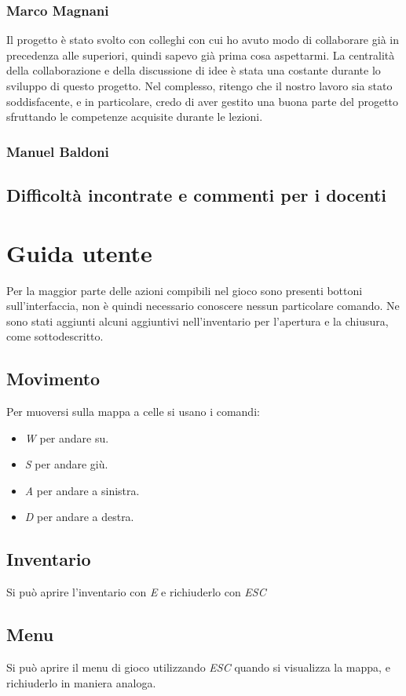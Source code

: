 \documentclass[a4paper,12pt]{report}
\begin{document}
\subsection{Marco Magnani}
Il progetto è stato svolto con colleghi con cui ho avuto modo di collaborare già in precedenza alle superiori, quindi sapevo già prima cosa aspettarmi. La centralità della collaborazione e della discussione di idee è stata una costante durante lo sviluppo di questo progetto. Nel complesso, ritengo che il nostro lavoro sia stato soddisfacente, e in particolare, credo di aver gestito una buona parte del progetto sfruttando le competenze acquisite durante le lezioni.
\subsection{Manuel Baldoni}

\section{Difficoltà incontrate e commenti per i docenti}

\appendix
\chapter{Guida utente}
Per la maggior parte delle azioni compibili nel gioco sono presenti bottoni sull'interfaccia, non è quindi necessario conoscere nessun particolare comando. Ne sono stati aggiunti alcuni aggiuntivi nell'inventario per l'apertura e la chiusura, come sottodescritto.
\section{Movimento}
Per muoversi sulla mappa a celle si usano i comandi:
\begin{itemize}
	\item \textit{W} per andare su.
	\item \textit{S} per andare giù.
	\item \textit{A} per andare a sinistra.
	\item \textit{D} per andare a destra.
\end{itemize}
\section{Inventario}
Si può aprire l'inventario con \textit{E} e richiuderlo con \textit{ESC}
\section{Menu}
Si può aprire il menu di gioco utilizzando \textit{ESC} quando si visualizza la mappa, e richiuderlo in maniera analoga.
\end{document}
